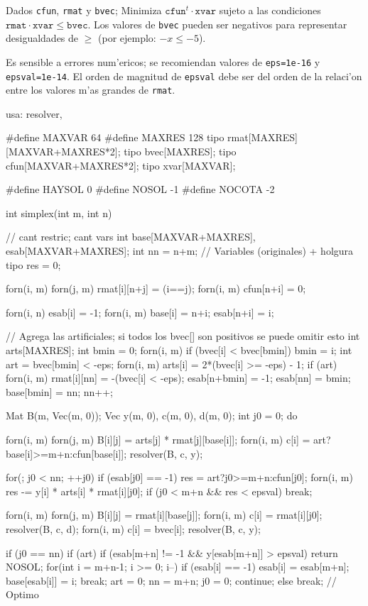 \documentclass[10pt,landscape,twocolumn,a4paper,notitlepage]{article}
\begin{document}
Dados \texttt{cfun}, \texttt{rmat} y \texttt{bvec}; Minimiza $\mathtt{cfun}^t \cdot \mathtt{xvar}$ sujeto a las condiciones $\mathtt{rmat} \cdot \mathtt{xvar} \leq \mathtt{bvec}$. Los valores de \texttt{bvec} pueden ser negativos para representar desigualdades de $\geq$ (por ejemplo: $-x \leq -5$).

Es sensible a errores num'ericos; se recomiendan valores de \texttt{eps=1e-16} y \texttt{epsval=1e-14}. El orden de magnitud de \texttt{epsval} debe ser del orden de la relaci'on entre los valores m'as grandes de \texttt{rmat}.
\begin{code}
usa: resolver,

#define MAXVAR 64
#define MAXRES 128
tipo rmat[MAXRES][MAXVAR+MAXRES*2];
tipo bvec[MAXRES];
tipo cfun[MAXVAR+MAXRES*2];
tipo xvar[MAXVAR];

#define HAYSOL	0
#define NOSOL -1
#define NOCOTA -2

int simplex(int m, int n) { // cant restric; cant vars
	int base[MAXVAR+MAXRES], esab[MAXVAR+MAXRES];
	int nn = n+m; // Variables (originales) + holgura
	tipo res = 0;

	forn(i, m) forn(j, m) rmat[i][n+j] = (i==j);
	forn(i, m) cfun[n+i] = 0;

	forn(i, n) esab[i] = -1;
	forn(i, m) { base[i] = n+i; esab[n+i] = i; }

	// Agrega las artificiales; si todos los bvec[] son positivos se puede omitir esto
	int arts[MAXRES];
	int bmin = 0;
	forn(i, m) if (bvec[i] < bvec[bmin]) bmin = i;
	int art = bvec[bmin] < -eps;
	forn(i, m) arts[i] = 2*(bvec[i] >= -eps) - 1;
	if (art) {
		forn(i, m) rmat[i][nn] = -(bvec[i] < -eps);
		esab[n+bmin] = -1; esab[nn] = bmin; base[bmin] = nn;
		nn++;
	}

	Mat B(m, Vec(m, 0));
	Vec y(m, 0), c(m, 0), d(m, 0);
	int j0 = 0;
	do {
		forn(i, m) forn(j, m) B[i][j] = arts[j] * rmat[j][base[i]];
		forn(i, m) c[i] = art?base[i]>=m+n:cfun[base[i]];
		resolver(B, c, y);

		for(; j0 < nn; ++j0) if (esab[j0] == -1) {
			res = art?j0>=m+n:cfun[j0];
			forn(i, m) res -= y[i] * arts[i] * rmat[i][j0];
			if (j0 < m+n && res < epsval) break;
		}

		forn(i, m) forn(j, m) B[i][j] = rmat[i][base[j]];
		forn(i, m) c[i] = rmat[i][j0];
		resolver(B, c, d);
		forn(i, m) c[i] = bvec[i];
		resolver(B, c, y);

		if (j0 == nn) if (art) {
			if (esab[m+n] != -1 && y[esab[m+n]] > epsval) return NOSOL;
			for(int i = m+n-1; i >= 0; i--) if (esab[i] == -1) { esab[i] = esab[m+n]; base[esab[i]] = i; break; }
			art = 0; nn = m+n; j0 = 0; continue;
		} else break; // Optimo

}}
\end{code}
\end{document}
